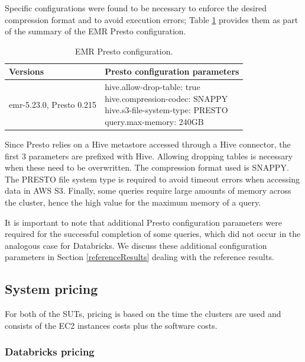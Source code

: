 Specific configurations were found to be necessary to enforce the desired compression format and to avoid execution errors; Table \ref{table:softwareConfPresto} provides them as part of the summary of the EMR Presto configuration.

\begin{table}
  \centering
	\begin{tabular}{|l|l|}
	  \hline
		\textbf{Versions} & \textbf{Presto configuration parameters} \\ \hline
		emr-5.23.0, Presto 0.215 & \makecell[l]{hive.allow-drop-table: true \\ hive.compression-codec: SNAPPY \\
		hive.s3-file-system-type: PRESTO \\ query.max-memory: 240GB} \\ \hline
	\end{tabular}
	\caption{EMR Presto configuration.}
	\label{table:softwareConfPresto}
\end{table}

Since Presto relies on a Hive metastore accessed through a Hive connector, the first 3 parameters are prefixed with Hive. Allowing dropping tables is necessary when these need to be overwritten. The compression format used is SNAPPY. The PRESTO file system type is required to avoid timeout errors when accessing data in AWS S3. Finally, some queries require large amounts of memory across the cluster, hence the high value for the maximum memory of a query.

It is important to note that additional Presto configuration parameters were required for the successful completion of some queries, which did not occur in the analogous case for Databricks. We discuss these additional configuration parameters in Section \ref{referenceResults} dealing with the reference results.

\subsection{System pricing}\label{systemPricing}

For both of the SUTs, pricing is based on the time the clusters are used and consists of the EC2 instances costs plus the software costs.

\subsubsection{Databricks pricing}


